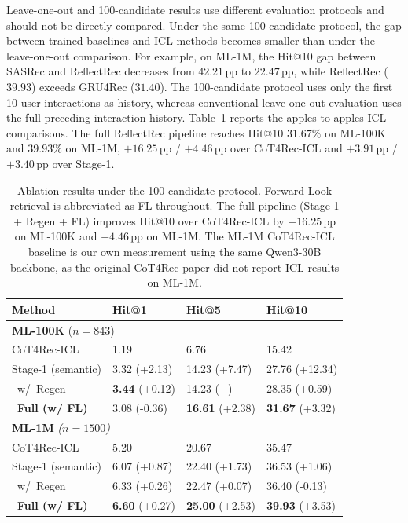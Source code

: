 \documentclass[11pt]{article}
\begin{document}
Leave-one-out and 100-candidate results use different evaluation protocols and should not be directly compared. Under the same 100-candidate protocol, the gap between trained baselines and ICL methods becomes smaller than under the leave-one-out comparison. For example, on ML-1M, the Hit@10 gap between SASRec and ReflectRec decreases from $42.21$\,pp to $22.47$\,pp, while ReflectRec ($39.93$) exceeds GRU4Rec ($31.40$). The 100-candidate protocol uses only the first 10 user interactions as history, whereas conventional leave-one-out evaluation uses the full preceding interaction history. Table~\ref{tab:main} reports the apples-to-apples ICL comparisons. The full ReflectRec pipeline reaches Hit@10 $31.67\%$ on ML-100K and $39.93\%$ on ML-1M, $+16.25$\,pp / $+4.46$\,pp over CoT4Rec-ICL and $+3.91$\,pp / $+3.40$\,pp over Stage-1.

\begin{table}[!t]
{\footnotesize
\setlength{\tabcolsep}{3pt}
\begin{tabular}{llll}
\toprule
\textbf{Method} & \textbf{Hit@1} & \textbf{Hit@5} & \textbf{Hit@10} \\
\midrule
\multicolumn{4}{l}{\textbf{ML-100K} ($n{=}843$)}\\
CoT4Rec-ICL            & 1.19 & 6.76 & 15.42\\
Stage-1 (semantic)     & 3.32 {\scriptsize(+2.13)} & 14.23 {\scriptsize(+7.47)} & 27.76 {\scriptsize(+12.34)}\\
~w/~Regen              &\textbf{3.44} {\scriptsize(+0.12)} & 14.23 {\scriptsize($-$)} & 28.35 {\scriptsize(+0.59)}\\
\rowcolor{yellow!30}
~\textbf{Full (w/ FL)} & 3.08 {\scriptsize(-0.36)} & \textbf{16.61} {\scriptsize(+2.38)} & \textbf{31.67} {\scriptsize(+3.32)}\\
\midrule
\multicolumn{4}{l}{\textbf{ML-1M} \textit{($n{=}1500$)}}\\
CoT4Rec-ICL            & 5.20 & 20.67 & 35.47\\
Stage-1 (semantic)     & 6.07 {\scriptsize(+0.87)} & 22.40 {\scriptsize(+1.73)} & 36.53 {\scriptsize(+1.06)}\\
~w/~Regen              & 6.33 {\scriptsize(+0.26)} & 22.47 {\scriptsize(+0.07)} & 36.40 {\scriptsize(-0.13)}\\
\rowcolor{yellow!30}
~\textbf{Full (w/ FL)} & \textbf{6.60} {\scriptsize(+0.27)} & \textbf{25.00} {\scriptsize(+2.53)} & \textbf{39.93} {\scriptsize(+3.53)}\\
\bottomrule
\end{tabular}
}
\caption{Ablation results under the 100-candidate protocol. Forward-Look retrieval is abbreviated as FL throughout. The full pipeline (Stage-1 + Regen + FL) improves Hit@10 over CoT4Rec-ICL by $+16.25$\,pp on ML-100K and $+4.46$\,pp on ML-1M. The ML-1M CoT4Rec-ICL baseline is our own measurement using the same Qwen3-30B backbone, as the original CoT4Rec paper did not report ICL results on ML-1M.\label{tab:main}}
\end{table}
\end{document}
